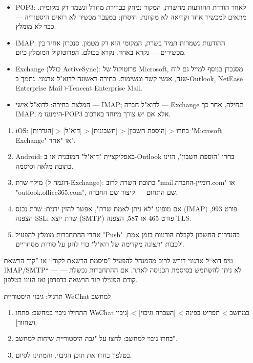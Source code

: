 
\begin{itemize}
  \item POP3: לאחר הורדת ההודעות מהשרת, המקור נמחק כברירת מחדל ונשמר רק מקומית. מתאים למכשיר אחד וקריאה לא מקוונת. חיסרון: במעבר מכשיר לא רואים היסטוריה — כבר לא מומלץ.
  \item IMAP: ההודעות נשמרות תמיד בשרת, המקומי הוא רק מטמון. סנכרון אחיד בין מכשירים — נקרא באחד, נקרא בכולם. הפרוטוקול המומלץ כיום.
  \item Exchange (כולל ActiveSync): פרוטוקול של Microsoft, מסנכרן בנוסף למייל גם לוח שנה, אנשי קשר ומשימות. בחירה ראשונה לדוא"ל ארגוני. נתמך ב-Outlook, NetEase Enterprise Mail ו-Tencent Enterprise Mail.
  \item המלצת בחירה: לדוא"ל אישי — IMAP; לדוא"ל חברה — Exchange תחילה, אחר כך IMAP; הימנעו מ-POP3 אלא אם יש צורך מיוחד בארכוב.
\end{itemize}


\begin{enumerate}
  \item iOS: [הגדרות] > [דוא"ל] > [חשבונות] > [הוספת חשבון] > בחרו "Microsoft Exchange" או "אחר".
  \item Android: באפליקציית "דוא"ל" המובנית או ב-Outlook בחרו "הוספת חשבון", הזינו כתובת מלאה וסיסמה.
  \item מילוי שרת (דוגמה ל-Exchange): כתובת השרת לרוב "mail.דומיין-החברה.com" או "outlook.office365.com", שם התחום — קיצור שם החברה.
  \item אם מופיע "לא ניתן לאמת שרת", אפשר להזין ידנית: שרת נכנס (IMAP) פורט 993, הצפנה SSL; שרת יוצא (SMTP) פורט 465 או 587, הצפנה TLS.
  \item אחרי ההתחברות מומלץ להפעיל "Push" בהגדרות החשבון לקבלת הודעות בזמן אמת, ולכבות "תצוגה מקדימה של דוא"ל" כדי להגן על סודות מסחריים.
\end{enumerate}

\begin{tcbinfo}{טיפ}
דוא“ל ארגוני דורש לרוב מהמנהל להפעיל ”סיסמת הרשאת לקוח“ או ”קוד הרשאת IMAP/SMTP“ — לא ניתן להשתמש בסיסמת הכניסה לאתר. אם ההתחברות נכשלת — קודם הפעילו קוד הרשאה בדפדפן ואז הזינו בטלפון.

\end{tcbinfo}

\begin{tcbpractice}{תרגול: גיבוי היסטוריית WeChat למחשב}
\begin{enumerate}
  \item התחילו גיבוי במחשב: פתחו WeChat במחשב > תפריט בפינה > [העברה וגיבוי] > [גיבוי ושחזור].
  \item בחרו גיבוי למחשב: לחצו על "גבה היסטוריית שיחות למחשב".
  \item בטלפון בחרו את תוכן הגיבוי, והמתינו לסיום.
\end{enumerate}

\end{tcbpractice}
